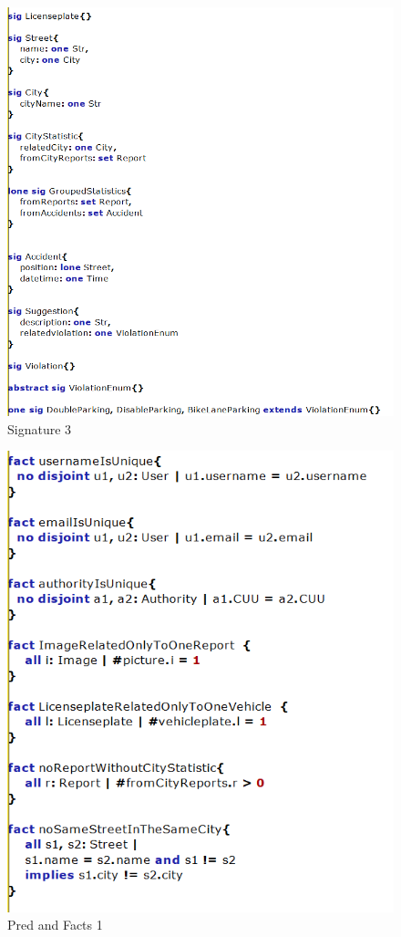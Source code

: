 \begin{figure}
	\centering
	\includegraphics[width=0.9\linewidth, height=0.7\textheight]{Images/Alloy/codealloy3}
	\caption{Signature 3}
	\label{Signature 3}
\end{figure}

\begin{figure}
	\centering
	\includegraphics[width=0.9\linewidth, height=0.8\textheight]{Images/Alloy/codealloy4}
	\caption{Pred and Facts 1}
	\label{Pred and Facts 1}
\end{figure}

